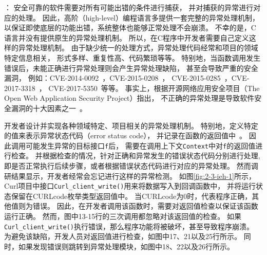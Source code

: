 \vspace*{10pt}
\begin{center}
	\noindent{}
\end{center}


：
安全可靠的软件需要对所有可能出错的条件进行捕获，
并对捕获的异常进行对应的处理。
因此，高阶（high-level）编程语言多提供一套完整的异常处理机制，
以保证即使底层的功能出错，系统整体也能够正常处理不会崩溃。
不幸的是，C语言并没有提供原生的异常处理机制。
所以，在C程序中开发者需要自己定义这样的异常处理机制。
由于缺少统一的处理方式，异常处理代码经常和项目的领域特定信息相关，
形式多样、重复性高、代码繁琐等等。
特别地，当函数调用发生错误后，未能正确进行异常处理则会产生异常处理缺陷，
甚至会导致严重的安全漏洞，
例如：CVE-2014-0092~\cite{CVE-2014-0092}，CVE-2015-0208~\cite{CVE-2015-0208}，
CVE-2015-0285~\cite{CVE-2015-0285}，CVE-2017-3318~\cite{CVE-2017-3318}，
CVE-2017-5350~\cite{CVE-2017-5350}等等。
事实上，根据开源网络应用安全项目（The Open Web Application Security Project）指出，
不正确的异常处理是导致软件安全漏洞的十大因素之一~\cite{07-owasp}。



开发者设计并实现各种领域特定、项目相关的异常处理机制。
特别地，定义特定的值来表示异常状态代码（error status code），
并记录在函数的返回值中~\cite{08-fast-eio}。
因此调用可能发生异常的目标接口\texttt{f}后，
需要在调用上下文\texttt{Context}中对\texttt{f}的返回值进行检查。
并根据检查的情况，针对正确和异常发生的错误状态代码分别进行处理,
即是否正常执行后续步骤，或者根据错误状态代码进行对应的异常处理。
然而调研结果显示，开发者经常会忘记进行这样的异常检测。
如图\ref{fig:2-3-ieh-1}所示，
Curl项目中接口\texttt{Curl\_client\_write()}用来将数据写入到回调函数中，
并将运行状态保留在CURLcode枚举类型返回值中。
当CURLcode为0时，代表程序正确，其他值则为错误。
因此，在开发者调用该函数时，需要对返回值检查以保证该函数运行正确。
然而，图中13-15行的三次调用都忽略对该返回值的检查。
如果\texttt{Curl\_client\_write()}执行错误，那么程序功能将被破坏，甚至导致程序崩溃。
为避免该缺陷，开发人员对返回值进行检查，如图中17、21以及25行所示。
同时，如果发现错误则跳转到异常处理模块，如图中18、22以及26行所示。

